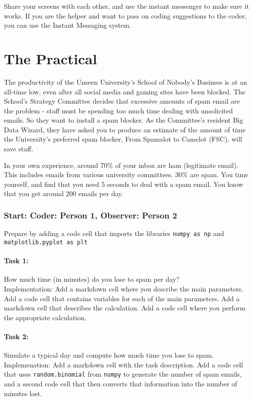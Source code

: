 \documentclass{article}
\begin{document}
Share your screens with each other, and use the instant messenger to make sure it works. If you are the helper and want to pass on coding suggestions to the coder, you can use the Instant Messaging system. 

\section{The Practical}

The productivity of the Unseen University's School of Nobody's Business is at an all-time low, even after all social media and gaming sites have been blocked. The School's Strategy Committee decides that excessive amounts of spam email are the problem - staff must be spending too much time dealing with unsolicited emails. So they want to install a spam blocker. As the Committee's resident Big Data Wizard, they have asked you to produce an estimate of the amount of time the University's preferred spam blocker, From Spamalot to Camelot (FSC), will save staff.

In your own experience, around 70\% of your inbox are ham (legitimate email). This includes emails from various university committees. 30\% are spam. You time yourself, and find that you need 5 seconds to deal with a spam email. You know that you get around 200 emails per day.

\subsubsection*{Start: Coder: Person 1, Observer: Person 2}

Prepare by adding a code cell that imports the libraries \texttt{numpy as np} and \texttt{matplotlib.pyplot as plt}

\paragraph{Task 1:} How much time (in minutes) do you lose to spam per day?\\
Implementation: Add a markdown cell where you describe the main parameters. Add a code cell that contains variables for each of the main parameters. Add a markdown cell that describes the calculation. Add a code cell where you perform the appropriate calculation. 

\paragraph{Task 2:} Simulate a typical day and compute how much time you lose to spam.\\
Implemenation: Add a markdown cell with the task description. Add a code cell that uses \texttt{random.binomial} from \texttt{numpy} to generate the number of spam emails, and a second code cell that then converts that information into the number of minutes lost.
\end{document}
